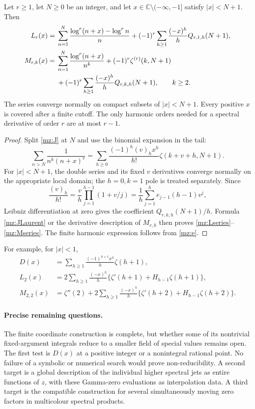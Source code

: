 \begin{theorem}
\label{mz:thm:coefficients}
Let $r\ge1$, let $N\ge0$ be an integer, and let
$x\in\mathbb C\setminus(-\infty,-1]$ satisfy $|x|<N+1$. Then
\begin{align}
 L_r(x)={}&\sum_{n=1}^{N}
        \frac{\log^r(n+x)-\log^r n}{n}
   +(-1)^r\sum_{h\ge1}\frac{(-x)^h}{h}Q_{r,1,h}(N+1),
       \label{mz:Lseries}\\
 M_{r,k}(x)={}&\sum_{n=1}^{N}\frac{\log^r(n+x)}{n^k}
       +(-1)^r\zeta^{(r)}(k,N+1)\notag\\
 &+(-1)^r\sum_{h\ge1}\frac{(-x)^h}{h}Q_{r,k,h}(N+1),
       \qquad k\ge2.
       \label{mz:Mseries}
\end{align}
The series converge normally on compact subsets of $|x|<N+1$.
Every positive $x$ is covered after a finite cutoff. The only harmonic
orders needed for a spectral derivative of order $r$ are at most $r-1$.
\end{theorem}

\begin{proof}
Split \eqref{mz:J} at $N$ and use the binomial expansion in the tail:
\[
 \sum_{n>N}\frac1{n^k(n+x)^v}
   =\sum_{h\ge0}\frac{(-1)^h(v)_h x^h}{h!}
                                      \zeta(k+v+h,N+1).
\]
For $|x|<N+1$, the double series and its fixed $v$ derivatives converge
normally on the appropriate local domain; the $h=0,k=1$ pole is treated
separately. Since
\[
 \frac{(v)_h}{h!}=\frac vh
       \prod_{j=1}^{h-1}(1+v/j)
       =\frac1h\sum_{j=1}^{h}e_{j-1}(h-1)v^j,
\]
Leibniz differentiation at zero gives the coefficient
$Q_{r,k,h}(N+1)/h$. Formula \eqref{mz:JLaurent} or the derivative
description of $M_{r,k}$ then proves \eqref{mz:Lseries}--\eqref{mz:Mseries}.
The finite harmonic expression follows from \eqref{mz:e}.
\end{proof}

For example, for $|x|<1$,
\begin{align}
 D(x)&=\sum_{h\ge1}\frac{(-1)^{h+1}x^h}{h}\zeta(h+1),\\
 L_2(x)&=2\sum_{h\ge1}\frac{(-x)^h}{h}
       \bigl\{\zeta'(h+1)+H_{h-1}\zeta(h+1)\bigr\},\\
 M_{2,2}(x)&=\zeta''(2)+2\sum_{h\ge1}\frac{(-x)^h}{h}
       \bigl\{\zeta'(h+2)+H_{h-1}\zeta(h+2)\bigr\}.
\end{align}

\paragraph{Precise remaining questions.}
The finite coordinate construction is complete, but whether some of its
nontrivial fixed-argument integrals reduce to a smaller field of special
values remains open. The first test is $D(x)$ at a positive integer or a
nonintegral rational point. No failure of a symbolic or numerical search
would prove non-reducibility. A second target is a global description of
the individual higher spectral jets as entire functions of $z$, with these
Gamma-zero evaluations as interpolation data. A third target is the
compatible construction for several simultaneously moving zero factors
in multicolour spectral products.
